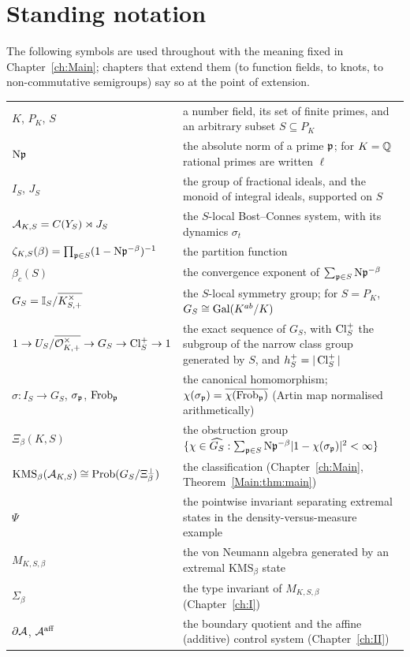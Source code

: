 \chapter*{Standing notation}

The following symbols are used throughout with the meaning fixed in
Chapter~\ref{ch:Main}; chapters that extend them (to function fields, to knots, to
non-commutative semigroups) say so at the point of extension.

\begin{center}\small
\renewcommand{\arraystretch}{1.25}
\begin{tabular}{lp{9.2cm}}
\hline
$K$, $P_K$, $S$ & a number field, its set of finite primes, and an arbitrary subset $S\subseteq P_K$\\
$\mathrm{N}\mathfrak{p}$ & the absolute norm of a prime $\mathfrak{p}$; for $K=\mathbb{Q}$ rational primes are written $\ell$\\
$I_S$, $J_S$ & the group of fractional ideals, and the monoid of integral ideals, supported on $S$\\
$\mathcal{A}_{K,S}=C(Y_S)\rtimes J_S$ & the $S$-local Bost--Connes system, with its dynamics $\sigma_t$\\
$\zeta_{K,S}(\beta)=\prod_{\mathfrak{p}\in S}(1-\mathrm{N}\mathfrak{p}^{-\beta})^{-1}$ & the partition function\\
$\beta_c(S)$ & the convergence exponent of $\sum_{\mathfrak{p}\in S}\mathrm{N}\mathfrak{p}^{-\beta}$\\
$G_S=\mathbb{I}_S/\overline{K^\times_{S,+}}$ & the $S$-local symmetry group; for $S=P_K$, $G_S\cong\operatorname{Gal}(K^{ab}/K)$\\
$1\to U_S/\overline{\mathcal{O}^\times_{K,+}}\to G_S\to\operatorname{Cl}^+_S\to1$ & the exact sequence of $G_S$, with $\operatorname{Cl}^+_S$ the subgroup of the narrow class group generated by $S$, and $h^+_S=|\operatorname{Cl}^+_S|$\\
$\sigma:I_S\to G_S$, $\sigma_{\mathfrak{p}}$, $\operatorname{Frob}_{\mathfrak{p}}$ & the canonical homomorphism; $\chi(\sigma_{\mathfrak{p}})=\overline{\chi(\operatorname{Frob}_{\mathfrak{p}})}$ (Artin map normalised arithmetically)\\
$\Xi_\beta(K,S)$ & the obstruction group $\{\chi\in\widehat{G_S}:\sum_{\mathfrak{p}\in S}\mathrm{N}\mathfrak{p}^{-\beta}|1-\chi(\sigma_{\mathfrak{p}})|^2<\infty\}$\\
$\mathrm{KMS}_\beta(\mathcal{A}_{K,S})\cong\mathrm{Prob}(G_S/\Xi_\beta^\perp)$ & the classification (Chapter~\ref{ch:Main}, Theorem~\ref{Main:thm:main})\\
$\Psi$ & the pointwise invariant separating extremal states in the density-versus-measure example\\
$M_{K,S,\beta}$ & the von Neumann algebra generated by an extremal $\mathrm{KMS}_\beta$ state\\
$\Sigma_\beta$ & the type invariant of $M_{K,S,\beta}$ (Chapter~\ref{ch:I})\\
$\partial\mathcal{A}$, $\mathcal{A}^{\mathrm{aff}}$ & the boundary quotient and the affine (additive) control system (Chapter~\ref{ch:II})\\
\hline
\end{tabular}
\end{center}

